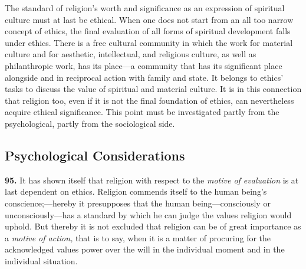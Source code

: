 \documentclass[12pt,a4paper]{book}
\begin{document}
The standard of religion's worth and significance as an expression of spiritual culture must at last be
ethical. When one does not start from an all too narrow concept of ethics, the final evaluation of all forms of
spiritual development falls under ethics. There is a free cultural community in which the work for material
culture and for aesthetic, intellectual, and religious culture, as well as philanthropic work, has its
place---a community that has its significant place alongside and in reciprocal action with family and state. It
belongs to ethics' tasks to discuss the value of spiritual and material culture. It is in this connection that
religion too, even if it is not the final foundation of ethics, can nevertheless acquire ethical significance.
This point must be investigated partly from the psychological, partly from the sociological side.

\subsection{Psychological Considerations}
\label{ssec:psych-considerations}

\noindent\textbf{95.} It has shown itself that religion with respect to the \emph{motive of
evaluation} is at last dependent on ethics. Religion commends itself to the human being's
conscience;---hereby it presupposes that the human being---consciously or unconsciously---has a
standard by which he can judge the values religion would uphold. But thereby it is not excluded
that religion can be of great importance as a \emph{motive of action,} that is to say, when it is
a matter of procuring for the acknowledged values power over the will in the individual moment and
in the individual situation.
\end{document}
